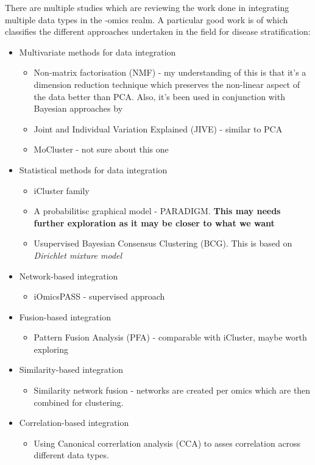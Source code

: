 There are multiple studies \citet{Menyhart2021-ef, Subramanian2020-tk, Picard2021-qr, Reel2021-sg} which are reviewing the work done in integrating multiple data types in the -omics realm. A particular good work is of \citet{Menyhart2021-ef} which classifies the different approaches undertaken in the field for disease stratification:
\begin{itemize}
    \item Multivariate methods for data integration
        \begin{itemize}
            \item Non-matrix factorisation (NMF) - my understanding of this is that it's a dimension reduction technique which preserves the non-linear aspect of the data better than PCA. Also, it's been used in conjunction with Bayesian approaches by \citet{Robertson2017-mg}
            \item Joint and Individual Variation Explained (JIVE) - similar to PCA
            \item MoCluster \cite{Meng2016-ui} - not sure about this one
        \end{itemize}
    \item Statistical methods for data integration
        \begin{itemize}
            \item iCluster family \citet{Shen2009-ew, Mo2013-zi, Mo2018-el}
            \item A probabilitisc graphical model - PARADIGM. \textbf{This may needs further exploration as it may be closer to what we want}
            \item Usupervised Bayesian Consensus Clustering (BCG). This is based on \textit{Dirichlet mixture model}
        \end{itemize}
    \item Network-based integration
        \begin{itemize}
            \item iOmicsPASS - supervised approach
        \end{itemize}
    \item Fusion-based integration
        \begin{itemize}
            \item Pattern Fusion Analysis (PFA) - comparable with iCluster, maybe worth exploring
        \end{itemize}
    \item Similarity-based integration
        \begin{itemize}
            \item Similarity network fusion - networks are created per omics which are then combined for clustering.
        \end{itemize}
    \item Correlation-based integration
        \begin{itemize}
            \item Using Canonical correrlation analysis (CCA) to asses correlation across different data types.
        \end{itemize}
\end{itemize}

